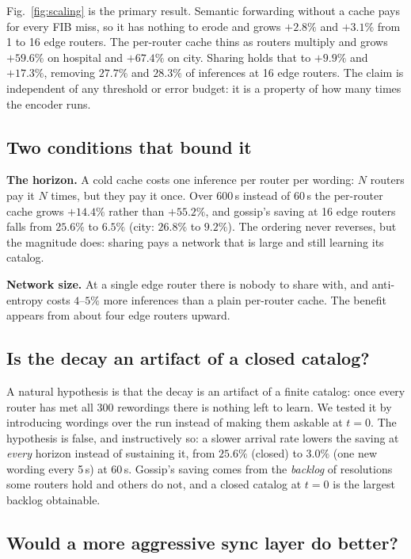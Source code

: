 \documentclass[conference,a4paper]{IEEEtran}
\begin{document}
Fig.~\ref{fig:scaling} is the primary result. Semantic forwarding without a
cache pays for every FIB miss, so it has nothing to erode and grows $+2.8\%$
and $+3.1\%$ from 1 to 16 edge routers. The per-router cache thins as routers
multiply and grows $+59.6\%$ on hospital and $+67.4\%$ on city. Sharing holds
that to $+9.9\%$ and $+17.3\%$, removing $27.7\%$ and $28.3\%$ of inferences
at 16 edge routers. The claim is independent of any threshold or error
budget: it is a property of how many times the encoder runs.

\subsection{Two conditions that bound it}

\textbf{The horizon.} A cold cache costs one inference per router per wording:
$N$ routers pay it $N$ times, but they pay it once. Over 600\,s instead of
60\,s the per-router cache grows $+14.4\%$ rather than $+55.2\%$, and gossip's
saving at 16 edge routers falls from $25.6\%$ to $6.5\%$ (city: $26.8\%$ to
$9.2\%$). The ordering never reverses, but the magnitude does: sharing pays a
network that is large and still learning its catalog.

\textbf{Network size.} At a single edge router there is nobody to share with,
and anti-entropy costs $4$--$5\%$ more inferences than a plain per-router
cache. The benefit appears from about four edge routers upward.

\subsection{Is the decay an artifact of a closed catalog?}

A natural hypothesis is that the decay is an artifact of a finite catalog:
once every router has met all 300 rewordings there is nothing left to learn.
We tested it by introducing wordings over the run instead of making them
askable at $t=0$. The hypothesis is false, and instructively so: a slower
arrival rate lowers the saving at \emph{every} horizon instead of sustaining
it, from $25.6\%$ (closed) to $3.0\%$ (one new wording every 5\,s) at 60\,s.
Gossip's saving comes from the \emph{backlog} of resolutions some routers hold
and others do not, and a closed catalog at $t=0$ is the largest backlog
obtainable.

\subsection{Would a more aggressive sync layer do better?}
\end{document}
